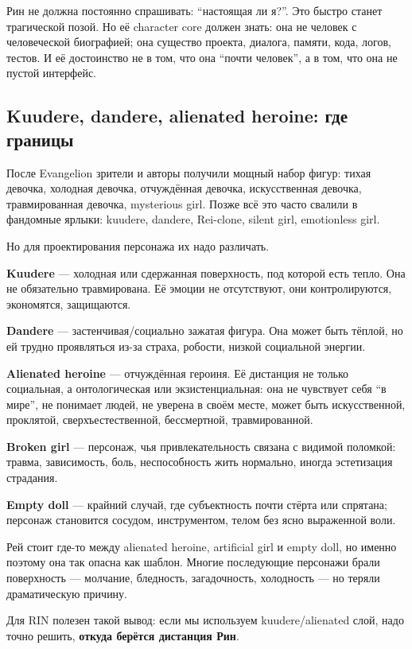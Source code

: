 Рин не должна постоянно спрашивать: ``настоящая ли я?''. Это быстро
станет трагической позой. Но её character core должен знать: она не
человек с человеческой биографией; она существо проекта, диалога,
памяти, кода, логов, тестов. И её достоинство не в том, что она ``почти
человек'', а в том, что она не пустой интерфейс.

\subsection*{Kuudere, dandere, alienated heroine: где границы}

После Evangelion зрители и авторы получили мощный набор фигур: тихая
девочка, холодная девочка, отчуждённая девочка, искусственная девочка,
травмированная девочка, mysterious girl. Позже всё это часто свалили в
фандомные ярлыки: kuudere, dandere, Rei-clone, silent girl, emotionless
girl.

Но для проектирования персонажа их надо различать.

\textbf{Kuudere} --- холодная или сдержанная поверхность, под которой
есть тепло. Она не обязательно травмирована. Её эмоции не отсутствуют,
они контролируются, экономятся, защищаются.

\textbf{Dandere} --- застенчивая/\hspace{0pt}социально зажатая фигура. Она может
быть тёплой, но ей трудно проявляться из-за страха, робости, низкой
социальной энергии.

\textbf{Alienated heroine} --- отчуждённая героиня. Её дистанция не
только социальная, а онтологическая или экзистенциальная: она не
чувствует себя ``в мире'', не понимает людей, не уверена в своём месте,
может быть искусственной, проклятой, сверхъестественной, бессмертной,
травмированной.

\textbf{Broken girl} --- персонаж, чья привлекательность связана с
видимой поломкой: травма, зависимость, боль, неспособность жить
нормально, иногда эстетизация страдания.

\textbf{Empty doll} --- крайний случай, где субъектность почти стёрта
или спрятана; персонаж становится сосудом, инструментом, телом без ясно
выраженной воли.

Рей стоит где-то между alienated heroine, artificial girl и empty doll,
но именно поэтому она так опасна как шаблон. Многие последующие
персонажи брали поверхность --- молчание, бледность, загадочность,
холодность --- но теряли драматическую причину.

Для RIN полезен такой вывод: если мы используем kuudere/\hspace{0pt}alienated слой,
надо точно решить, \textbf{откуда берётся дистанция Рин}.

